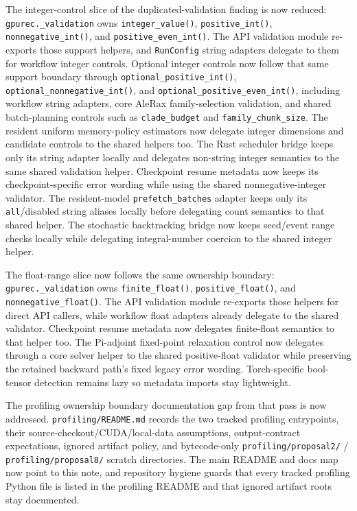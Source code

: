 \documentclass[11pt]{article}
\begin{document}
The integer-control slice of the duplicated-validation finding is now reduced:
\texttt{gpurec.\_validation} owns \texttt{integer\_value()},
\texttt{positive\_int()}, \texttt{nonnegative\_int()}, and
\texttt{positive\_even\_int()}.  The API validation module re-exports those
support helpers, and \texttt{RunConfig} string adapters delegate to them for
workflow integer controls.  Optional integer controls now follow that same
support boundary through \texttt{optional\_positive\_int()},
\texttt{optional\_nonnegative\_int()}, and
\texttt{optional\_positive\_even\_int()}, including workflow string adapters,
core AleRax family-selection validation, and shared batch-planning controls
such as \texttt{clade\_budget} and \texttt{family\_chunk\_size}.  The
resident uniform memory-policy estimators now delegate integer dimensions and
candidate controls to the shared helpers too.  The Rust scheduler bridge keeps
only its string adapter locally and delegates non-string integer semantics to
the same shared validation helper.  Checkpoint resume metadata now keeps its
checkpoint-specific error wording while using the shared nonnegative-integer
validator.  The resident-model \texttt{prefetch\_batches} adapter keeps only
its \texttt{all}/disabled string aliases locally before delegating count
semantics to that shared helper.  The stochastic backtracking bridge now keeps
seed/event range checks locally while delegating integral-number coercion to
the shared integer helper.

The float-range slice now follows the same ownership boundary:
\texttt{gpurec.\_validation} owns \texttt{finite\_float()},
\texttt{positive\_float()}, and \texttt{nonnegative\_float()}.  The API
validation module re-exports those helpers for direct API callers, while
workflow float adapters already delegate to the shared validator.
Checkpoint resume metadata now delegates finite-float semantics to that helper
too.  The Pi-adjoint fixed-point relaxation control now delegates through a
core solver helper to the shared positive-float validator while preserving the
retained backward path's fixed legacy error wording.  Torch-specific
bool-tensor detection remains lazy so metadata imports stay lightweight.

The profiling ownership boundary documentation gap from that pass is now
addressed.  \texttt{profiling/README.md} records the two tracked profiling
entrypoints, their source-checkout/CUDA/local-data assumptions, output-contract
expectations, ignored artifact policy, and bytecode-only
\texttt{profiling/proposal2/} / \texttt{profiling/proposal8/} scratch
directories.  The main README and docs map now point to this note, and
repository hygiene guards that every tracked profiling Python file is listed in
the profiling README and that ignored artifact roots stay documented.
\end{document}
